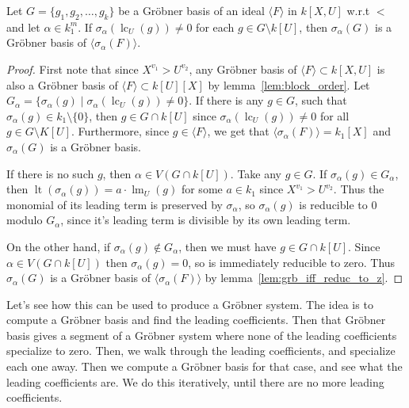 \documentclass[a4paper, 12pt]{article}
\DeclareMathOperator{\LT}{lt}
\DeclareMathOperator{\LM}{lm}
\DeclareMathOperator{\LC}{lc}
\theoremstyle{changedot}
\theoremstyle{changedotbreak}
\theoremstyle{nonumberplain}
\newtheorem{proof}{Proof}
\begin{document}
\begin{lemma}\label{lem:grb_if_nmap_to_z}
  Let $G = \{g_{1}, g_{2}, \dots, g_{k}\}$ be a Gröbner basis of an ideal $\langle F \rangle$ in $k[X, U]$ w.r.t $<$ and let $\alpha \in k_{1}^{m}$. If $\sigma_{\alpha}(\LC_{U}(g)) \neq 0$ for each $g \in G \setminus k[U]$, then $\sigma_{\alpha}(G)$ is a Gröbner basis of $\langle \sigma_{\alpha}(F) \rangle$.
\end{lemma}
\begin{proof}
  First note that since $X^{v_{1}} > U^{v_{2}}$, any Gröbner basis of $\langle F \rangle \subset k[X, U]$ is also a Gröbner basis of $\langle F \rangle \subset k[U][X]$ by lemma~\ref{lem:block_order}. Let $G_{\alpha} = \{\sigma_{\alpha}(g) \mid \sigma_{\alpha}(\LC_{U}(g)) \neq 0\}$. If there is any $g \in G$, such that $\sigma_{\alpha}(g) \in k_{1} \setminus \{0\}$, then $g \in G \cap k[U]$ since $\sigma_{\alpha}(\LC_{U}(g)) \neq 0$ for all $g \in G \setminus K[U]$. Furthermore, since $g \in \langle F \rangle$, we get that $\langle \sigma_{\alpha}(F) \rangle = k_{1}[X]$ and $\sigma_{\alpha}(G)$ is a Gröbner basis.

  If there is no such $g$, then $\alpha \in V(G \cap k[U])$. Take any $g \in G$. If $\sigma_{\alpha}(g) \in G_{\alpha}$, then $\LT(\sigma_{\alpha}(g)) = a \cdot \LM_{U}(g)$ for some $a \in k_{1}$ since $X^{v_{1}} > U^{v_{2}}$. Thus the monomial of its leading term is preserved by $\sigma_{\alpha}$, so $\sigma_{\alpha}(g)$ is reducible to $0$ modulo $G_{\alpha}$, since it's leading term is divisible by its own leading term.

  On the other hand, if $\sigma_{\alpha}(g) \notin G_{\alpha}$, then we must have $g \in G \cap k[U]$. Since $\alpha \in V(G \cap k[U])$ then $\sigma_{\alpha}(g) = 0$, so is immediately reducible to zero. Thus $\sigma_{\alpha}(G)$ is a Gröbner basis of $\langle \sigma_{\alpha}(F) \rangle$ by lemma~\ref{lem:grb_iff_reduc_to_z}.
\end{proof}

Let's see how this can be used to produce a Gröbner system. The idea is to compute a Gröbner basis and find the leading coefficients. Then that Gröbner basis gives a segment of a Gröbner system where none of the leading coefficients specialize to zero. Then, we walk through the leading coefficients, and specialize each one away. Then we compute a Gröbner basis for that case, and see what the leading coefficients are. We do this iteratively, until there are no more leading coefficients.
\end{document}
